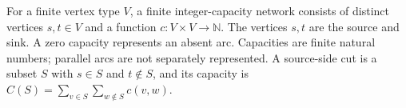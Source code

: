 \begin{definition}
For a finite vertex type $V$, a finite integer-capacity network consists of
distinct vertices $s,t\in V$ and a function $c:V\times V\to\mathbb N$.
The vertices $s,t$ are the source and sink. A zero capacity represents an
absent arc. Capacities are finite natural numbers; parallel arcs are not
separately represented. A source-side cut is a subset $S$ with $s\in S$
and $t\notin S$, and its capacity is
$C(S)=\sum_{v\in S}\sum_{w\notin S}c(v,w)$.
\end{definition}
